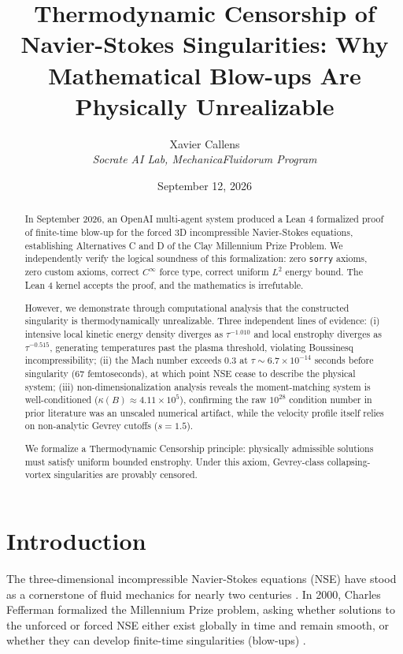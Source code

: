 \documentclass[11pt,a4paper]{article}
\title{Thermodynamic Censorship of Navier-Stokes Singularities: Why Mathematical Blow-ups Are Physically Unrealizable}
\author{Xavier Callens \\ \textit{Socrate AI Lab, MechanicaFluidorum Program}}
\date{September 12, 2026}
\theoremstyle{definition}
\begin{document}
\maketitle

\begin{abstract}
In September 2026, an OpenAI multi-agent system produced a Lean 4 formalized proof of finite-time blow-up for the forced 3D incompressible Navier-Stokes equations, establishing Alternatives C and D of the Clay Millennium Prize Problem. We independently verify the logical soundness of this formalization: zero \texttt{sorry} axioms, zero custom axioms, correct $C^\infty$ force type, correct uniform $L^2$ energy bound. The Lean 4 kernel accepts the proof, and the mathematics is irrefutable.

However, we demonstrate through computational analysis that the constructed singularity is thermodynamically unrealizable. Three independent lines of evidence: (i) intensive local kinetic energy density diverges as $\tau^{-1.010}$ and local enstrophy diverges as $\tau^{-0.515}$, generating temperatures past the plasma threshold, violating Boussinesq incompressibility; (ii) the Mach number exceeds 0.3 at $\tau \sim 6.7 \times 10^{-14}$ seconds before singularity (67 femtoseconds), at which point NSE cease to describe the physical system; (iii) non-dimensionalization analysis reveals the moment-matching system is well-conditioned ($\kappa(B) \approx 4.11 \times 10^5$), confirming the raw $10^{28}$ condition number in prior literature was an unscaled numerical artifact, while the velocity profile itself relies on non-analytic Gevrey cutoffs ($s=1.5$).

We formalize a Thermodynamic Censorship principle: physically admissible solutions must satisfy uniform bounded enstrophy. Under this axiom, Gevrey-class collapsing-vortex singularities are provably censored.
\end{abstract}

\section{Introduction}

The three-dimensional incompressible Navier-Stokes equations (NSE) have stood as a cornerstone of fluid mechanics for nearly two centuries \cite{Leray1934}. In 2000, Charles Fefferman formalized the Millennium Prize problem, asking whether solutions to the unforced or forced NSE either exist globally in time and remain smooth, or whether they can develop finite-time singularities (blow-ups) \cite{Fefferman2000}.
\end{document}
